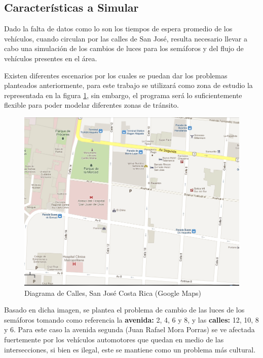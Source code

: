 \documentclass[12pt,journal,compsoc]{IEEEtran}
\begin{document}
\subsection{Caracter\'{i}sticas a Simular}
Dado la falta de datos como lo son los tiempos de espera promedio de los veh\'{i}culos, cuando circulan por las calles de San Jos\'{e}, resulta necesario llevar a cabo una simulaci\'{o}n de los cambios de luces para los sem\'{a}foros y del flujo de veh\'{i}culos presentes en el \'{a}rea. 

Existen diferentes escenarios por los cuales se puedan dar los problemas planteados anteriormente, para este trabajo se utilizar\'{a} como zona de estudio la representada en la figura \ref{fig:traficoSJ}, sin embargo, el programa será lo suficientemente flexible para poder modelar diferentes zonas de tr\'ansito.
	
	\begin{figure}[htp]
\centering
\includegraphics[scale=0.37]{images/trafico1.png}
\caption{Diagrama de Calles, San Jos\'e Costa Rica (Google Maps)}
\label{fig:traficoSJ}
\end{figure}

		Basado en dicha imagen, se plantea el problema de cambio de las luces de los
	sem\'{a}foros tomando como referencia la \textbf{avenida:} 2, 4, 6 y 8,  y las
	\textbf{calles:}
	12, 10, 8 y 6. Para este caso la avenida segunda (Juan Rafael Mora Porras) se ve afectada fuertemente por los veh\'{i}culos automotores que quedan en medio de las intersecciones, si bien es ilegal, este se mantiene como un problema m\'{a}s cultural.
			
\end{document}
